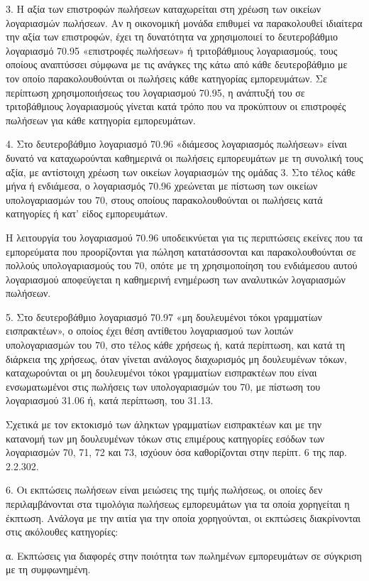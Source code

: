 \documentclass[A4,10pt,greek]{book}
\begin{document}
3. Η αξία των επιστροφών πωλήσεων καταχωρείται στη χρέωση των οικείων λογαριασμών πωλήσεων. Αν η οικονομική μονάδα επιθυμεί να παρακολουθεί ιδιαίτερα την αξία των επιστροφών, έχει τη δυνατότητα να χρησιμοποιεί το δευτεροβάθμιο λογαριασμό 70.95 «επιστροφές πωλήσεων» ή τριτοβάθμιους λογαριασμούς, τους οποίους αναπτύσσει σύμφωνα με τις ανάγκες της κάτω από κάθε δευτεροβάθμιο με τον οποίο παρακολουθούνται οι πωλήσεις κάθε κατηγορίας εμπορευμάτων. Σε περίπτωση χρησιμοποιήσεως του λογαριασμού 70.95, η ανάπτυξή του σε τριτοβάθμιους λογαριασμούς γίνεται κατά τρόπο που να προκύπτουν οι επιστροφές πωλήσεων για κάθε κατηγορία εμπορευμάτων.

4. Στο δευτεροβάθμιο λογαριασμό 70.96 «διάμεσος λογαριασμός πωλήσεων» είναι δυνατό να καταχωρούνται καθημερινά οι πωλήσεις εμπορευμάτων με τη συνολική τους αξία, με αντίστοιχη χρέωση των οικείων λογαριασμών της ομάδας 3. Στο τέλος κάθε μήνα ή ενδιάμεσα, ο λογαριασμός 70.96 χρεώνεται με πίστωση των οικείων υπολογαριασμών του 70, στους οποίους παρακολουθούνται οι πωλήσεις κατά κατηγορίες ή κατ' είδος εμπορευμάτων.

Η λειτουργία του λογαριασμού 70.96 υποδεικνύεται για τις περιπτώσεις εκείνες που τα εμπορεύματα που προορίζονται για πώληση κατατάσσονται και παρακολουθούνται σε πολλούς υπολογαριασμούς του 70, οπότε με τη χρησιμοποίηση του ενδιάμεσου αυτού λογαριασμού αποφεύγεται η καθημερινή ενημέρωση των αναλυτικών λογαριασμών πωλήσεων.

5. Στο δευτεροβάθμιο λογαριασμό 70.97 «μη δουλευμένοι τόκοι γραμματίων εισπρακτέων», ο οποίος έχει θέση αντίθετου λογαριασμού των λοιπών υπολογαριασμών του 70, στο τέλος κάθε χρήσεως ή, κατά περίπτωση, και κατά τη διάρκεια της χρήσεως, όταν γίνεται ανάλογος διαχωρισμός μη δουλευμένων τόκων, καταχωρούνται οι μη δουλευμένοι τόκοι γραμματίων εισπρακτέων που είναι ενσωματωμένοι στις πωλήσεις των υπολογαριασμών του 70, με πίστωση του λογαριασμού 31.06 ή, κατά περίπτωση, του 31.13.

Σχετικά με τον εκτοκισμό των άληκτων γραμματίων εισπρακτέων και με την κατανομή των μη δουλευμένων τόκων στις επιμέρους κατηγορίες εσόδων των λογαριασμών 70, 71, 72 και 73, ισχύουν όσα καθορίζονται στην περίπτ. 6 της παρ. 2.2.302.

6. Οι εκπτώσεις πωλήσεων είναι μειώσεις της τιμής πωλήσεως, οι οποίες δεν περιλαμβάνονται στα τιμολόγια πωλήσεως εμπορευμάτων για τα οποία χορηγείται η έκπτωση. Ανάλογα με την αιτία για την οποία χορηγούνται, οι εκπτώσεις διακρίνονται στις ακόλουθες κατηγορίες:

α. Εκπτώσεις για διαφορές στην ποιότητα των πωλημένων εμπορευμάτων σε σύγκριση με τη συμφωνημένη.
\end{document}
